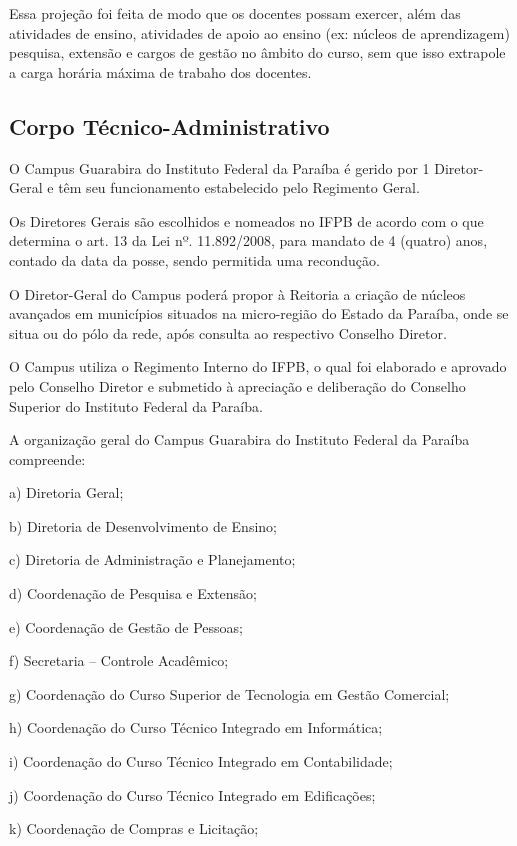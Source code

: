Essa proje\c{c}\~ao foi feita de modo que os docentes possam exercer, al\'em das atividades de ensino, atividades de apoio ao ensino (ex: n\'ucleos de aprendizagem) pesquisa, extens\~ao e cargos de gest\~ao no \^ambito do curso, sem que isso extrapole a carga hor\'aria m\'axima de trabaho dos docentes.

\subsection{Corpo T\'ecnico-Administrativo}

O Campus Guarabira do Instituto Federal da Paraíba é gerido por 1 Diretor-Geral e têm seu funcionamento estabelecido pelo Regimento Geral.

Os Diretores Gerais são escolhidos e nomeados no IFPB de acordo com o que determina o art. 13 da Lei nº. 11.892/2008, para mandato de 4 (quatro) anos, contado da data da posse, sendo permitida uma recondução.

O Diretor-Geral do Campus poderá propor à Reitoria a criação de núcleos avançados em municípios situados na micro-região do Estado da Paraíba, onde se situa ou do pólo da rede, após consulta ao respectivo Conselho Diretor.

O Campus utiliza o Regimento Interno do IFPB, o qual foi elaborado e aprovado pelo Conselho Diretor e submetido à apreciação e deliberação do Conselho Superior do Instituto Federal da Paraíba.

A organização geral do Campus Guarabira do Instituto Federal da Paraíba compreende:

a)	Diretoria Geral;

b)	Diretoria de Desenvolvimento de Ensino;

c)	Diretoria de Administração e Planejamento;

d)	Coordenação de Pesquisa e Extensão;

e)	Coordenação de Gestão de Pessoas;

f)	Secretaria – Controle Acadêmico;

g)	Coordenação do Curso Superior de Tecnologia em Gestão Comercial;

h)	Coordenação do Curso T\'ecnico Integrado em Inform\'atica;

i)	Coordenação do Curso T\'ecnico Integrado em Contabilidade;

j)	Coordenação do Curso T\'ecnico Integrado em Edifica\c{c}\~oes;

k)      Coordena\c{c}\~ao de Compras e Licita\c{c}\~ao;

